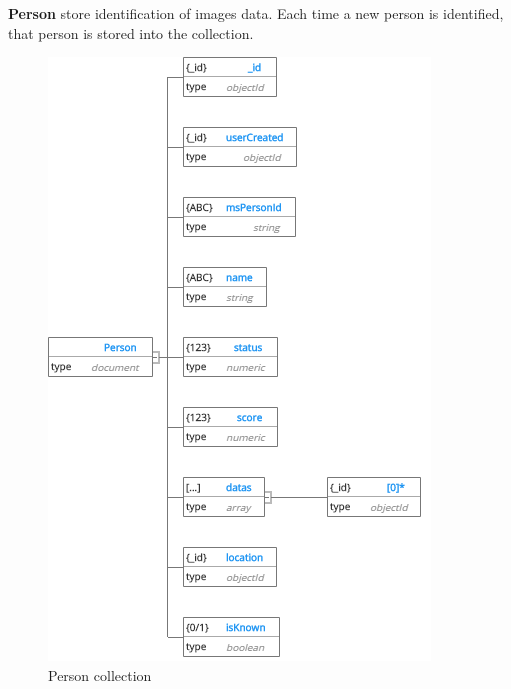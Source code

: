 \textbf{Person} store identification of images data. Each time a new person is identified, that person is stored into the collection.
\begin{center}
	\begin{figure}[H]
		\centering
		\includegraphics[width=0.7\columnwidth]{images/chap4/Person.png}
		\caption{Person collection}
	\end{figure}
\end{center}
\cleardoublepage

